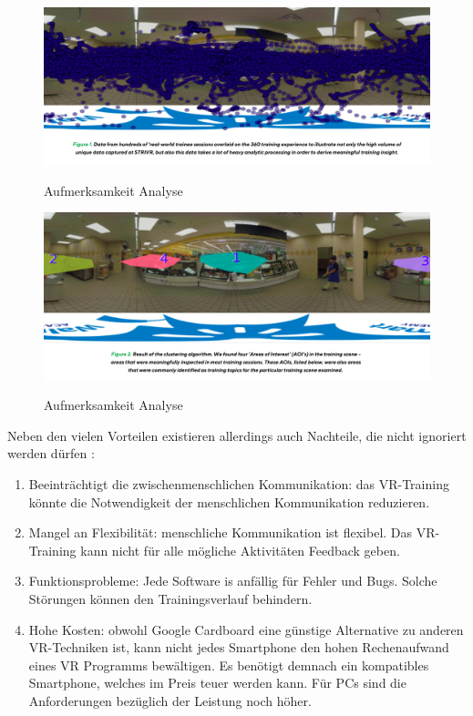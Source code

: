 \begin{figure}[ht]
\vspace*{1em}
\centering
\caption{Aufmerksamkeit Analyse }
\includegraphics[width=\textwidth]{images/intentionanalys1.png}
\label{fig:intentionanalys1}
\end{figure}

\begin{figure}[ht]
\vspace*{1em}
\centering
\caption{Aufmerksamkeit Analyse }
\includegraphics[width=\textwidth]{images/intentionanalys2.png}
\label{fig:intentionanalys2} 
\end{figure}

Neben den vielen Vorteilen existieren allerdings auch Nachteile, die nicht ignoriert werden dürfen \citep{17}:

\begin{enumerate}
\item Beeinträchtigt die zwischenmenschlichen Kommunikation: das VR-Training könnte die Notwendigkeit der menschlichen Kommunikation reduzieren.
\item Mangel an Flexibilität: menschliche Kommunikation ist flexibel. Das VR-Training kann nicht für alle mögliche Aktivitäten Feedback geben.
\item Funktionsprobleme: Jede Software is anfällig für Fehler und Bugs. Solche Störungen können den Trainingsverlauf behindern.
\item Hohe Kosten: obwohl Google Cardboard eine günstige Alternative zu anderen VR-Techniken ist, kann nicht jedes Smartphone den hohen Rechenaufwand eines VR Programms bewältigen. Es benötigt demnach ein kompatibles Smartphone, welches im Preis teuer werden kann. Für PCs sind die Anforderungen bezüglich der Leistung noch höher.
\end{enumerate}\

